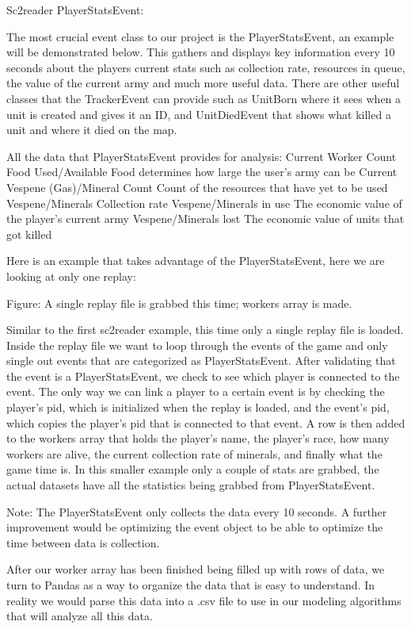 \documentclass[a4paper,12pt]{report}
\begin{document}
Sc2reader PlayerStatsEvent:

The most crucial event class to our project is the PlayerStatsEvent, an example will be demonstrated below. This gathers and displays key information every 10 seconds about the players current stats such as collection rate, resources in queue, the value of the current army and much more useful data. There are other useful classes that the TrackerEvent can provide such as UnitBorn where it sees when a unit is created and gives it an ID, and UnitDiedEvent that shows what killed a unit and where it died on the map.

All the data that PlayerStatsEvent provides for analysis:
Current Worker Count
Food Used/Available
Food determines how large the user’s army can be
Current Vespene (Gas)/Mineral Count
Count of the resources that have yet to be used
Vespene/Minerals Collection rate
Vespene/Minerals in use
The economic value of the player’s current army
Vespene/Minerals lost
The economic value of units that got killed

Here is an example that takes advantage of the PlayerStatsEvent, here we are looking at only one replay:

Figure: A single replay file is grabbed this time; workers array is made.

Similar to the first sc2reader example, this time only a single replay file is loaded. Inside the replay file we want to loop through the events of the game and only single out events that are categorized as PlayerStatsEvent. After validating that the event is a PlayerStatsEvent, we check to see which player is connected to the event. The only way we can link a player to a certain event is by checking the player’s pid, which is initialized when the replay is loaded, and the event’s pid, which copies the player’s pid that is connected to that event. A row is then added to the workers array that holds the player’s name, the player’s race, how many workers are alive, the current collection rate of minerals, and finally what the game time is. In this smaller example only a couple of stats are grabbed, the actual datasets have all the statistics being grabbed from PlayerStatsEvent.

Note: The PlayerStatsEvent only collects the data every 10 seconds. A further improvement would be optimizing the event object to be able to optimize the time between data is collection.

After our worker array has been finished being filled up with rows of data, we turn to Pandas as a way to organize the data that is easy to understand. In reality we would parse this data into a .csv file to use in our modeling algorithms that will analyze all this data.
\end{document}

